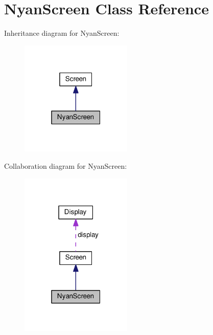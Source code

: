 \hypertarget{classNyanScreen}{}\section{Nyan\+Screen Class Reference}
\label{classNyanScreen}


Inheritance diagram for Nyan\+Screen\+:\nopagebreak
\begin{figure}[H]
\begin{center}
\leavevmode
\includegraphics[width=151pt]{classNyanScreen__inherit__graph}
\end{center}
\end{figure}


Collaboration diagram for Nyan\+Screen\+:\nopagebreak
\begin{figure}[H]
\begin{center}
\leavevmode
\includegraphics[width=151pt]{classNyanScreen__coll__graph}
\end{center}
\end{figure}
